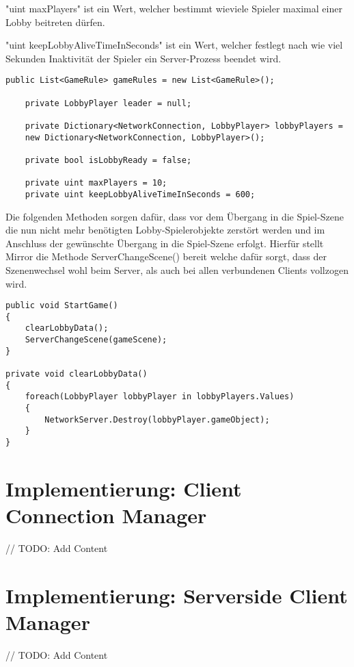 "uint maxPlayers" ist ein Wert, welcher bestimmt wieviele Spieler maximal einer Lobby beitreten dürfen.

"uint keepLobbyAliveTimeInSeconds" ist ein Wert, welcher festlegt nach wie viel Sekunden Inaktivität der Spieler ein Server-Prozess beendet wird.

\begin{lstlisting}[caption= GameNetworkManager.cs Lobby Variables]
	public List<GameRule> gameRules = new List<GameRule>();
	
	private LobbyPlayer leader = null;
	
	private Dictionary<NetworkConnection, LobbyPlayer> lobbyPlayers = 
	new Dictionary<NetworkConnection, LobbyPlayer>();
	
	private bool isLobbyReady = false;
	
	private uint maxPlayers = 10;
	private uint keepLobbyAliveTimeInSeconds = 600;
\end{lstlisting}

Die folgenden Methoden sorgen dafür, dass vor dem Übergang in die Spiel-Szene die nun nicht mehr benötigten Lobby-Spielerobjekte zerstört werden und im Anschluss der gewünschte Übergang in die Spiel-Szene erfolgt. Hierfür stellt Mirror die Methode ServerChangeScene() bereit welche dafür sorgt, dass der Szenenwechsel wohl beim Server, als auch bei allen verbundenen Clients vollzogen wird.

\begin{lstlisting}[caption= GameNetworkManager.cs StartGame]
public void StartGame()
{
	clearLobbyData();
	ServerChangeScene(gameScene);
}

private void clearLobbyData()
{
	foreach(LobbyPlayer lobbyPlayer in lobbyPlayers.Values)
	{
		NetworkServer.Destroy(lobbyPlayer.gameObject);
	}
}

\end{lstlisting}

\section{Implementierung: Client Connection Manager}

// TODO: Add Content

\section{Implementierung: Serverside Client Manager}

// TODO: Add Content

